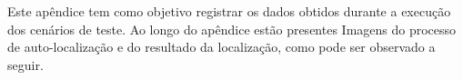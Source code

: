 
Este apêndice tem como objetivo registrar os dados obtidos durante a execução dos cenários de teste. Ao longo do apêndice estão presentes
Imagens do processo de auto-localização e do resultado da localização, como pode ser observado a seguir.






